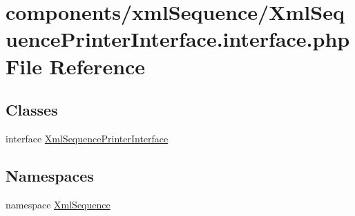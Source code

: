 \hypertarget{_xml_sequence_printer_interface_8interface_8php}{
\section{components/xmlSequence/XmlSequencePrinterInterface.interface.php File Reference}
\label{_xml_sequence_printer_interface_8interface_8php}
}
\subsection*{Classes}
\begin{CompactItemize}
\item 
interface \hyperlink{interface_xml_sequence_printer_interface}{XmlSequencePrinterInterface}
\end{CompactItemize}
\subsection*{Namespaces}
\begin{CompactItemize}
\item 
namespace \hyperlink{namespace_xml_sequence}{XmlSequence}
\end{CompactItemize}
